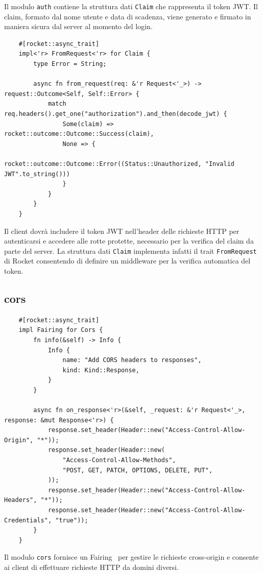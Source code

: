 Il modulo \texttt{auth} contiene la struttura dati \texttt{Claim} che rappresenta il token JWT.
Il claim, formato dal nome utente e data di scadenza, viene 
generato e firmato in maniera sicura dal server al momento del login.

\begin{listing}[H]
    \begin{verbatim}
    #[rocket::async_trait]
    impl<'r> FromRequest<'r> for Claim {
        type Error = String;

        async fn from_request(req: &'r Request<'_>) -> request::Outcome<Self, Self::Error> {
            match req.headers().get_one("authorization").and_then(decode_jwt) {
                Some(claim) => rocket::outcome::Outcome::Success(claim),
                None => {
                    rocket::outcome::Outcome::Error((Status::Unauthorized, "Invalid JWT".to_string()))
                }
            }
        }
    }
    \end{verbatim}
\end{listing}


Il client dovrà includere il token JWT nell'header delle richieste HTTP per autenticarsi e accedere alle rotte protette,
necessario per la verifica del claim da parte del server.
La struttura dati \texttt{Claim} implementa infatti il trait \texttt{FromRequest} di Rocket
consentendo di definire un middleware per la verifica automatica del token.

\subsection{cors}

\begin{listing}[H]
    \begin{verbatim}
    #[rocket::async_trait]
    impl Fairing for Cors {
        fn info(&self) -> Info {
            Info {
                name: "Add CORS headers to responses",
                kind: Kind::Response,
            }
        }

        async fn on_response<'r>(&self, _request: &'r Request<'_>, response: &mut Response<'r>) {
            response.set_header(Header::new("Access-Control-Allow-Origin", "*"));
            response.set_header(Header::new(
                "Access-Control-Allow-Methods",
                "POST, GET, PATCH, OPTIONS, DELETE, PUT",
            ));
            response.set_header(Header::new("Access-Control-Allow-Headers", "*"));
            response.set_header(Header::new("Access-Control-Allow-Credentials", "true"));
        }
    }
    \end{verbatim}
\end{listing}

Il modulo \texttt{cors} fornisce un Fairing~\cite{rocket_fairing} per gestire le richieste cross-origin
e consente ai client di effettuare richieste HTTP da domini diversi.